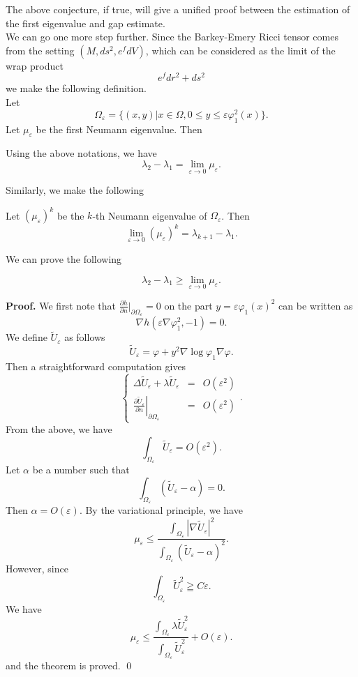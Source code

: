 The above conjecture, if true, will give a unified proof between the estimation
of the first eigenvalue and gap estimate.
\\

We can go one more step further. Since the Barkey-Emery Ricci tensor comes from
the setting $(M, ds^2, e^f dV)$, which can be considered as the limit of the
wrap product
\[
e^f dr^2 + ds^2
\]
we make the following definition.
\\

Let
\[
\Omega_\varepsilon = \{(x,y)|x\in \Omega, 
0\leqslant y \leqslant \varepsilon \varphi_1^2(x)\}.
\]
Let $\mu_\varepsilon$ be the first Neumann eigenvalue. Then
\begin{conjecture}\label{conj4}
Using the above notations, we have
\[
\lambda_2 - \lambda_1 = \lim_{\varepsilon\rightarrow 0} \mu_\varepsilon.
\]
\end{conjecture}

Similarly, we make the following
\begin{conjecture}
Let $(\mu_\varepsilon)^k$ be the $k$-th Neumann eigenvalue of 
$\Omega_\varepsilon$. Then
\[
\lim_{\varepsilon\rightarrow 0}(\mu_\varepsilon)^k = \lambda_{k+1} - \lambda_1.
\]
\end{conjecture}

We can prove the following
\begin{theorem}
\[
\lambda_2 - \lambda_1 \geqslant \lim_{\varepsilon\rightarrow 0}\mu_\varepsilon.
\]
\end{theorem}
{\bf Proof.}
We first note that 
$\frac{\partial h}{\partial n}|_{\partial\Omega_\varepsilon} = 0$ on the part
$y = \varepsilon\varphi_1(x)^2$ can be written as
\[
\nabla h(\varepsilon\nabla\varphi_1^2, -1) = 0.
\]
We define $\widetilde{U}_\varepsilon$ as follows
\[
\widetilde{U}_\varepsilon = \varphi + y^2 \nabla\log\varphi_1\nabla\varphi.
\]
Then a straightforward computation gives
\[
\left\{\begin{array}{rcl}
\Delta\widetilde{U}_\varepsilon + \lambda\widetilde{U}_\varepsilon & = &
O(\varepsilon^2) \\
\left.\frac{\partial\widetilde{U}_\varepsilon}{\partial n}
\right|_{\partial\Omega_\varepsilon} & = & O(\varepsilon^2)
\end{array}
\right..
\]
From the above, we have
\[
\int_{\Omega_\varepsilon}\widetilde{U}_\varepsilon = O(\varepsilon^2).
\]
Let $\alpha$ be a number such that
\[
\int_{\Omega_\varepsilon}(\widetilde{U}_\varepsilon - \alpha) = 0.
\]
Then $\alpha = O(\varepsilon)$. By the variational principle, we have
\[
\mu_\varepsilon \leqslant 
\frac{\int_{\Omega_\varepsilon}|\nabla\widetilde{U}_\varepsilon|^2}
{\int_{\Omega_\varepsilon}(\widetilde{U}_\varepsilon - \alpha)^2}.
\]
However, since
\[
\int_{\Omega_\varepsilon}\widetilde{U}_\varepsilon^2 \geqq C\varepsilon.
\]
We have
\[
\mu_\varepsilon \leqslant 
\frac{\int_{\Omega_\varepsilon}\lambda\widetilde{U}_\varepsilon^2}
{\int_{\Omega_\varepsilon}\widetilde{U}_\varepsilon^2} + O(\varepsilon).
\]
and the theorem is proved.
\qed



